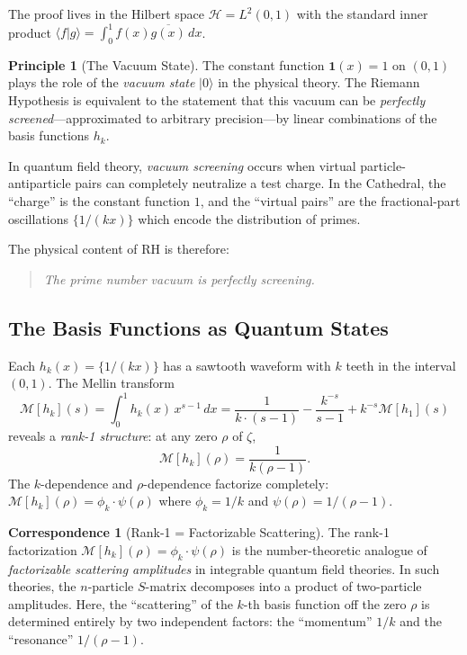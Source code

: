 \documentclass[11pt,a4paper]{article}
\theoremstyle{definition}
\newtheorem{principle}[definition]{Principle}
\newtheorem{correspondence}[definition]{Correspondence}
\newcommand{\HH}{\mathcal{H}}
\newcommand{\fract}[1]{\{#1\}}
\newcommand{\ket}[1]{| #1 \rangle}
\newcommand{\braket}[2]{\langle #1 | #2 \rangle}
\begin{document}
The proof lives in the Hilbert space $\HH = L^2(0,1)$ with the standard
inner product $\braket{f}{g} = \int_0^1 f(x)\overline{g(x)}\,dx$.

\begin{principle}[The Vacuum State]
The constant function $\mathbf{1}(x) = 1$ on $(0,1)$ plays the role of
the \emph{vacuum state} $\ket{0}$ in the physical theory. The Riemann
Hypothesis is equivalent to the statement that this vacuum can be
\emph{perfectly screened}---approximated to arbitrary precision---by
linear combinations of the basis functions $h_k$.
\end{principle}

In quantum field theory, \emph{vacuum screening} occurs when virtual
particle-antiparticle pairs can completely neutralize a test charge.
In the Cathedral, the ``charge'' is the constant function $1$, and the
``virtual pairs'' are the fractional-part oscillations $\fract{1/(kx)}$
which encode the distribution of primes.

The physical content of RH is therefore:
\begin{quote}
\emph{The prime number vacuum is perfectly screening.}
\end{quote}

\subsection{The Basis Functions as Quantum States}

Each $h_k(x) = \fract{1/(kx)}$ has a sawtooth waveform with $k$ teeth
in the interval $(0,1)$. The Mellin transform
\[
  \mathcal{M}[h_k](s) = \int_0^1 h_k(x) \, x^{s-1}\,dx = \frac{1}{k \cdot (s-1)}
  - \frac{k^{-s}}{s-1} + k^{-s}\mathcal{M}[h_1](s)
\]
reveals a \emph{rank-1 structure}: at any zero $\rho$ of $\zeta$,
\[
  \mathcal{M}[h_k](\rho) = \frac{1}{k(\rho - 1)}.
\]
The $k$-dependence and $\rho$-dependence factorize completely:
$\mathcal{M}[h_k](\rho) = \phi_k \cdot \psi(\rho)$ where
$\phi_k = 1/k$ and $\psi(\rho) = 1/(\rho-1)$.

\begin{correspondence}[Rank-1 = Factorizable Scattering]
The rank-1 factorization $\mathcal{M}[h_k](\rho) = \phi_k \cdot \psi(\rho)$
is the number-theoretic analogue of \emph{factorizable scattering amplitudes}
in integrable quantum field theories. In such theories, the $n$-particle
$S$-matrix decomposes into a product of two-particle amplitudes. Here,
the ``scattering'' of the $k$-th basis function off the zero $\rho$ is
determined entirely by two independent factors: the ``momentum'' $1/k$
and the ``resonance'' $1/(\rho-1)$.
\end{correspondence}
\end{document}

